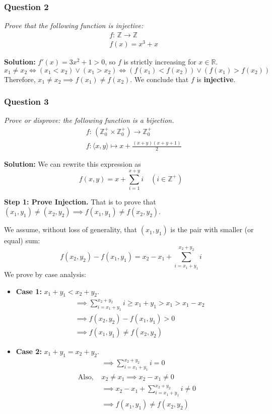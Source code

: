 \documentclass[
	letterpaper, %
	11pt, %
]{CSUniSchoolLabReport}
\begin{document}
\pagebreak

\subsubsection*{Question 2}
\textit{Prove that the following function is injective:}
\begin{align*}
&f\!:\,\mathbb{Z} \to \mathbb{Z} \\
&f(x) = x^3 + x
\end{align*}

\textbf{Solution:} $f'(x) = 3x^2 + 1 > 0$, so $f$ is strictly increasing for $x \in \mathbb{R}$.
\[
x_1 \neq x_2 \iff (x_1 < x_2) \lor (x_1 > x_2) \iff (f(x_1) < f(x_2)) \lor (f(x_1) > f(x_2))
\]
Therefore, $x_1 \neq x_2 \implies f(x_1) \neq f(x_2)$.
We conclude that $f$ is \textbf{injective}.

\subsubsection*{Question 3}
\textit{Prove or disprove: the following function is a bijection.}
\begin{align*}
&f\!:\,(\mathbb{Z}^+_0 \times \mathbb{Z}^+_0) \to \mathbb{Z}^+_0 \\
&f\!: \langle x,y \rangle \mapsto x + \frac{(x+y)(x+y+1)}{2}
\end{align*}

\pagebreak

\textbf{Solution:} We can rewrite this expression as
\[
f(x,y) = x + \sum_{i=1}^{x+y} i \quad (i \in \mathbb{Z}^+)
\]

\textbf{Step 1: Prove Injection.}
That is to prove that $(x_1,y_1) \neq (x_2,y_2) \implies f(x_1,y_1) \neq f(x_2,y_2)$.

We assume, without loss of generality, that $(x_1,y_1)$ is the pair with smaller (or equal) sum:
\[
f(x_2,y_2) - f(x_1,y_1) = x_2 - x_1 + \sum_{i=x_1+y_1}^{x_2+y_2} i
\]
We prove by case analysis:
\begin{itemize}
	\item \textbf{Case 1:} $x_1 + y_1 < x_2 + y_2$.
	\begin{align*}
		&\implies \sum_{i=x_1+y_1}^{x_2+y_2} i \geq x_1 + y_1 > x_1 > x_1 - x_2 \\
		&\implies f(x_2,y_2) - f(x_1,y_1) > 0 \\
		&\implies f(x_1,y_1) \neq f(x_2,y_2)
	\end{align*}

	\item \textbf{Case 2:} $x_1 + y_1 = x_2 + y_2$.
	\begin{align*}
		&\implies \sum_{i=x_1+y_1}^{x_2+y_2} i = 0 \\
		\text{Also, } &x_2 \neq x_1 \implies x_2 - x_1 \neq 0 \\
		&\implies x_2 - x_1 + \sum_{i=x_1+y_1}^{x_2+y_2} i \neq 0 \\
		&\implies f(x_1,y_1) \neq f(x_2,y_2)
	\end{align*}
\end{itemize}
\end{document}
